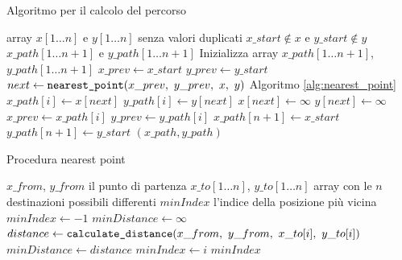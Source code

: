 \begin{algorithm}
    \caption{Algoritmo per il calcolo del percorso}
    \label{alg:calculate_track}
    \begin{algorithmic}
        \Require array $x[1 \dotso n]$ e $y[1 \dotso n]$ senza valori duplicati
        \Require $x\_start \notin x$ e $y\_start \notin y$
        \Ensure $x\_path[1 \dotso n+1]$ e $y\_path[1 \dotso n+1]$
        \State Inizializza array $x\_path[1 \dotso n+1]$, $y\_path[1 \dotso n+1]$
        \State $x\_prev \leftarrow x\_start$
        \State $y\_prev \leftarrow y\_start$
            \State $next \leftarrow \verb|nearest_point|(x\_prev,\  y\_prev,\  x,\  y)$
            \Comment Algoritmo \ref{alg:nearest_point}
            \State $x\_path[i] \leftarrow x[next]$
            \State $y\_path[i] \leftarrow y[next]$
            \State $x[next] \leftarrow \infty$
            \State $y[next] \leftarrow \infty$
            \State $x\_prev \leftarrow x\_path[i]$
            \State $y\_prev \leftarrow y\_path[i]$
        \EndFor
        \State $x\_path[n+1] \leftarrow x\_start$
        \State $y\_path[n+1] \leftarrow y\_start$
        \State \Return $(x\_path , y\_path)$
    \end{algorithmic}
\end{algorithm}

\begin{algorithm}
    \caption{Procedura nearest point}
    \label{alg:nearest_point}
    \begin{algorithmic}
        \Require $x\_from$, $y\_from$ il punto di partenza
        \Require $x\_to[1 \dotso n]$, $y\_to[1 \dotso n]$ array con le $n$ destinazioni possibili differenti
        \Ensure $minIndex$ l'indice della posizione più vicina
        \State $minIndex \leftarrow -1$
        \State $minDistance \leftarrow \infty$
            \State $distance \leftarrow \verb|calculate_distance|(x\_from,\  y\_from,\  x\_to[i],\  y\_to[i])$
                \State $minDistance \leftarrow distance$
                \State $minIndex \leftarrow i$
            \EndIf
        \EndFor
        \State \Return $minIndex$
    \end{algorithmic}
\end{algorithm}

